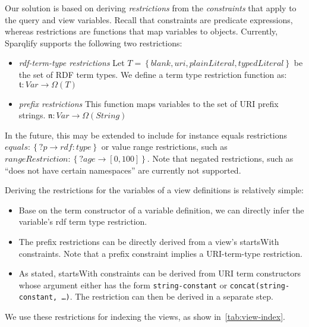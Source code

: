 \documentclass[a4paper,twoside,bibtotoc,abstracton,12pt,BCOR=15mm]{scrreprt}
\begin{document}
Our solution is based on deriving \emph{restrictions} from the \emph{constraints} that apply to the query and view variables.
Recall that constraints are predicate expressions, whereas restrictions are functions that map variables to objects.
Currently, Sparqlify supports the following two restrictions:
\begin{itemize}
  \item \emph{rdf-term-type restrictions} Let $T = \left \{blank, uri, plainLiteral, typedLiteral \right \}$ be the set of RDF term types. We define
  a term type restriction function as: $\mathfrak{t}: Var \rightarrow \Omega \left ( T  \right)$
  \item \emph{prefix restrictions} This function maps variables to the set of URI prefix strings. $\mathfrak{n}: Var \rightarrow \Omega \left( String \right)$
\end{itemize}
In the future, this may be extended to include for instance equals restrictions $equals: \left \{?p \rightarrow rdf:type \right\}$
or value range restrictions, such as $rangeRestriction: \left \{?age \rightarrow [0, 100] \right\}$.
Note that negated restrictions, such as ``does not have certain namespaces'' are currently not supported.


Deriving the restrictions for the variables of a view definitions is relatively simple:
\begin{itemize}
  \item Base on the term constructor of a variable definition, we can directly infer the variable's rdf term type restriction.
  \item The prefix restrictions can be directly derived from a view's startsWith constraints. Note that a prefix constraint implies a URI-term-type restriction. 
  \item As stated, startsWith constraints can be derived from URI term constructors whose argument either has the form \texttt{string-constant} or \texttt{concat(string-constant, \ldots)}.
  The restriction can then be derived in a separate step. 
\end{itemize}
We use these restrictions for indexing the views, as show in~\autoref{tab:view-index}. 
\end{document}
